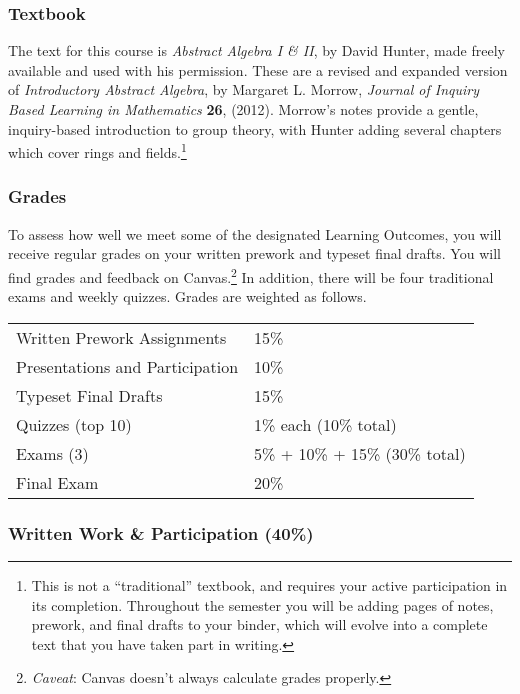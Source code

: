 \documentclass[
  twoside]{article}
\begin{document}
\subsubsection{Textbook}\label{textbook}

The text for this course is \emph{Abstract Algebra I \& II}, by David
Hunter, made freely available and used with his permission. These are a
revised and expanded version of \emph{Introductory Abstract Algebra}, by
Margaret L. Morrow, \emph{Journal of Inquiry Based Learning in
Mathematics} \textbf{26}, (2012). Morrow's notes provide a gentle,
inquiry-based introduction to group theory, with Hunter adding several
chapters which cover rings and fields.\footnote{This is not a
  ``traditional'' textbook, and requires your active participation in
  its completion. Throughout the semester you will be adding pages of
  notes, prework, and final drafts to your binder, which will evolve
  into a complete text that you have taken part in writing.}

\subsubsection{Grades}\label{grades}

To assess how well we meet some of the designated Learning Outcomes, you
will receive regular grades on your written prework and typeset final
drafts. You will find grades and feedback on Canvas.\footnote{\emph{Caveat}:
  Canvas doesn't always calculate grades properly.} In addition, there
will be four traditional exams and weekly quizzes. Grades are weighted
as follows.

\begin{tabular}[t]{ll}
\toprule
Written Prework Assignments & 15\%\\
Presentations and Participation & 10\%\\
Typeset Final Drafts & 15\%\\
Quizzes (top 10) & 1\% each (10\% total)\\
Exams (3) & 5\% + 10\% + 15\% (30\% total)\\
\addlinespace
Final Exam & 20\%\\
\bottomrule
\end{tabular}

\subsubsection{Written Work \& Participation
(40\%)}\label{written-work-participation-40}
\end{document}
